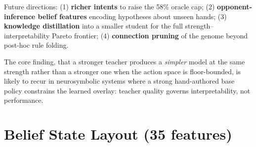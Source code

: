 \documentclass[runningheads]{llncs}
\begin{document}
Future directions: (1) \textbf{richer intents} to raise the 58\% oracle cap;
(2) \textbf{opponent-inference belief features} encoding hypotheses about
unseen hands; (3) \textbf{knowledge distillation} into a smaller student for the
full strength--interpretability Pareto frontier; (4) \textbf{connection pruning}
of the genome beyond post-hoc rule folding.

The core finding, that a stronger teacher produces a \emph{simpler} model at the
same strength rather than a stronger one when the action space is floor-bounded,
is likely to recur in neurosymbolic systems where a strong hand-authored base
policy constrains the learned overlay: teacher quality governs
interpretability, not performance.






\appendix
\section{Belief State Layout (35 features)}
\end{document}
